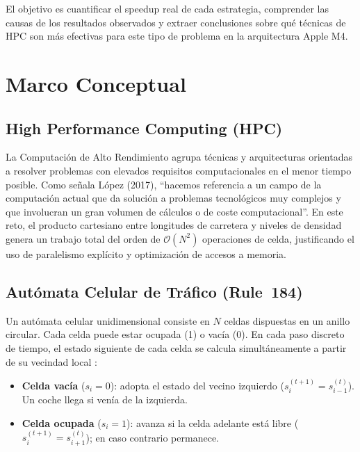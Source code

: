 \documentclass{article}
\begin{document}
El objetivo es cuantificar el speedup real de cada estrategia, comprender las causas de
los resultados observados y extraer conclusiones sobre qu\'e t\'ecnicas de HPC son m\'as
efectivas para este tipo de problema en la arquitectura Apple M4.

\section{Marco Conceptual}

\subsection{High Performance Computing (HPC)}

La Computaci\'on de Alto Rendimiento agrupa t\'ecnicas y arquitecturas orientadas a
resolver problemas con elevados requisitos computacionales en el menor tiempo posible.
Como se\~nala L\'opez (2017), ``hacemos referencia a un campo de la computaci\'on actual
que da soluci\'on a problemas tecnol\'ogicos muy complejos y que involucran un gran
volumen de c\'alculos o de coste computacional''. En este reto, el producto cartesiano
entre longitudes de carretera y niveles de densidad genera un trabajo total del orden de
$\mathcal{O}(N^2)$ operaciones de celda, justificando el uso de paralelismo expl\'icito y
optimizaci\'on de accesos a memoria.

\subsection{Aut\'omata Celular de Tr\'afico (Rule~184)}

Un aut\'omata celular unidimensional consiste en $N$ celdas dispuestas en un anillo
circular. Cada celda puede estar ocupada (1) o vac\'ia (0). En cada paso discreto de
tiempo, el estado siguiente de cada celda se calcula simult\'aneamente a partir de su
vecindad local \cite{trafficmodel}:

\begin{itemize}
    \item \textbf{Celda vac\'ia} ($s_i = 0$): adopta el estado del vecino izquierdo
          ($s_i^{(t+1)} = s_{i-1}^{(t)}$). Un coche llega si ven\'ia de la izquierda.
    \item \textbf{Celda ocupada} ($s_i = 1$): avanza si la celda adelante est\'a libre
          ($s_i^{(t+1)} = s_{i+1}^{(t)}$); en caso contrario permanece.
\end{itemize}
\end{document}
